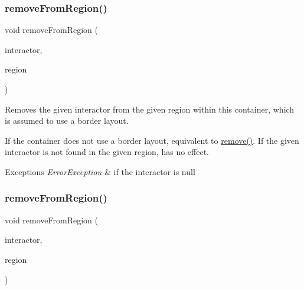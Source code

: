 \subsubsection{\texorpdfstring{remove\+From\+Region()}{removeFromRegion()}\hspace{0.1cm}{\footnotesize\ttfamily [1/6]}}
{\footnotesize\ttfamily void remove\+From\+Region (\begin{DoxyParamCaption}\item[{\mbox{\hyperlink{classsgl_1_1GInteractor}{G\+Interactor}} $\ast$}]{interactor,  }\item[{\mbox{\hyperlink{classsgl_1_1GContainer_a81a01a86de31071a92e6cce0bab9bc4b}{Region}}}]{region }\end{DoxyParamCaption})\hspace{0.3cm}{\ttfamily [virtual]}}



Removes the given interactor from the given region within this container, which is assumed to use a border layout. 

If the container does not use a border layout, equivalent to \mbox{\hyperlink{classsgl_1_1GContainer_a1c12b1fde5c2ef10d79d4ee51e670efa}{remove()}}. If the given interactor is not found in the given region, has no effect. 
\begin{DoxyExceptions}{Exceptions}
{\em Error\+Exception} & if the interactor is null \\
\hline
\end{DoxyExceptions}
\mbox{\label{classsgl_1_1GContainer_a16268c8344a5a5d9b10bde95764112d1}} 
\subsubsection{\texorpdfstring{remove\+From\+Region()}{removeFromRegion()}\hspace{0.1cm}{\footnotesize\ttfamily [2/6]}}
{\footnotesize\ttfamily void remove\+From\+Region (\begin{DoxyParamCaption}\item[{\mbox{\hyperlink{classsgl_1_1GInteractor}{G\+Interactor}} $\ast$}]{interactor,  }\item[{const std\+::string \&}]{region }\end{DoxyParamCaption})\hspace{0.3cm}{\ttfamily [virtual]}}



